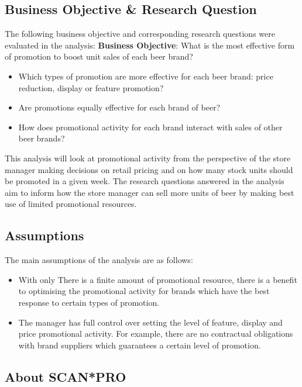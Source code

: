\documentclass[a4paper,11pt]{article}
\begin{document}
\subsection{Business Objective \& Research Question}
The following business objective and corresponding research questions were evaluated in the analysis:
\newline
\newline
\textbf{Business Objective}: What is the most effective form of promotion to boost unit sales of each beer brand?
\begin{itemize}
        \item Which types of promotion are more effective for each beer brand: price reduction, display or feature promotion?
        \item Are promotions equally effective for each brand of beer?
        \item How does promotional activity for each brand interact with sales of other beer brands?
\end{itemize}
\newline
\newline

This analysis will look at promotional activity from the perspective of the store manager making decisions on retail pricing and on how many stock units should be promoted in a given week. The research questions answered in the analysis aim to inform how the store manager can sell more units of beer by making best use of limited promotional resources. 

\subsection{Assumptions}

The main assumptions of the analysis are as follows:
\begin{itemize}
    \item With only There is a finite amount of promotional resource, there is a benefit to optimising the promotional activity for brands which have the best response to certain types of promotion.
    \item The manager has full control over setting the level of feature, display and price promotional activity. For example, there are no contractual obligations with brand suppliers which guarantees a certain level of promotion.
\end{itemize}


\subsection{About SCAN*PRO}
\end{document}
